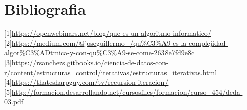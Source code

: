 \documentclass[spanish]{article}
\begin{document}
		\section{Bibliografia}
		{[}1{]}\url{https://openwebinars.net/blog/que-es-un-algoritmo-informatico/}\\
		{[}2{]}\url{https://medium.com/@joseguillermo_/qu%C3%A9-es-la-complejidad-algor%C3%ADtmica-y-con-qu%C3%A9-se-come-2638e7fd9e8c}\\
		{[}3{]}\url{https://rsanchezs.gitbooks.io/ciencia-de-datos-con-r/content/estructuras_control/iterativas/estructuras_iterativas.html}\\
		{[}4{]}\url{https://thatcsharpguy.com/tv/recursion-iteracion/}\\
		{[}5{]}\url{http://formacion.desarrollando.net/cursosfiles/formacion/curso_454/deda-03.pdf}		
\end{document}
